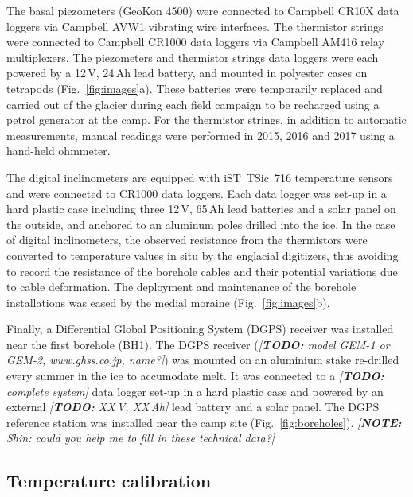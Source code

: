 \documentclass[utf8]{article}
\newcommand{\note}[1]{\textcolor{c0}{\emph{[\textbf{NOTE:} #1]}}}
\newcommand{\todo}[1]{\textcolor{c3}{\emph{[\textbf{TODO:} #1]}}}
\begin{document}
    The basal piezometers (GeoKon 4500) were connected to Campbell CR10X data
    loggers via Campbell AVW1 vibrating wire interfaces. The thermistor strings
    \citep[NTC~Fenwal 135-103FAG-J01,][]{Ryser.2014} were connected to Campbell
    CR1000 data loggers via Campbell AM416 relay multiplexers. The piezometers
    and thermistor strings data loggers were each powered by a 12\,V, 24\,Ah
    lead battery, and mounted in polyester cases on tetrapods
    (Fig.~\ref{fig:images}a). These batteries were temporarily replaced and
    carried out of the glacier during each field campaign to be recharged using
    a petrol generator at the camp. For the thermistor strings, in addition to
    automatic measurements, manual readings were performed in 2015, 2016 and
    2017 using a hand-held ohmmeter.

    The digital inclinometers \citep[DIBOSS,][]{Ryser.2014, Ryser.etal.2014,
    Ryser.etal.2014a} are equipped with iST~TSic~716 temperature sensors and
    were connected to CR1000 data loggers. Each data logger
    was set-up in a hard plastic case including three 12\,V, 65\,Ah lead
    batteries and a solar panel on the outside, and anchored to an aluminum
    poles drilled into the ice.
    In the case of digital inclinometers, the observed resistance from the
    thermistors were converted to temperature values in situ by the englacial
    digitizers, thus avoiding to record the resistance of the borehole cables
    and their potential variations due to cable deformation. The deployment and
    maintenance of the borehole installations was eased by the medial moraine
    (Fig.~\ref{fig:images}b).

    Finally, a Differential Global Positioning System (DGPS) receiver was
    installed near the first borehole (BH1). The DGPS receiver (\todo{
    model GEM-1 or GEM-2, www.ghss.co.jp, name?})
    was mounted on an aluminium stake re-drilled every summer in the
    ice to accumodate melt. It was connected to a \todo{complete system} data
    logger set-up in a hard plastic case and powered by an external
    \todo{XX\,V, XX\,Ah} lead battery and a solar panel. The DGPS reference
    station was installed near the camp site (Fig.~\ref{fig:boreholes}).
    \note{Shin: could you help me to fill in these technical data?}


\subsection{Temperature calibration}
\end{document}
